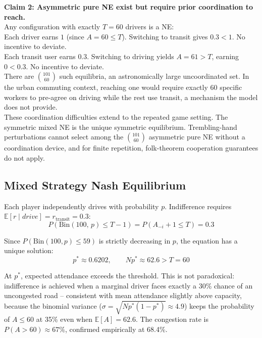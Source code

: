 \textbf{Claim 2: Asymmetric pure NE exist but require prior coordination to reach.} \\

Any configuration with exactly $T = 60$ drivers is a NE: \\

Each driver earns $1$ (since $A = 60 \leq T$). Switching to transit gives $0.3 < 1$. No incentive to deviate. \\
Each transit user earns $0.3$. Switching to driving yields $A = 61 > T$, earning $0 < 0.3$. No incentive to deviate. \\

There are $\binom{101}{60}$ such equilibria, an astronomically large uncoordinated set. In the urban commuting context, reaching one would require exactly 60 specific workers to pre-agree on driving while the rest use transit, a mechanism the model does not provide. \\

These coordination difficulties extend to the repeated game setting. The symmetric mixed NE is the unique symmetric equilibrium. Trembling-hand perturbations cannot select among the $\binom{101}{60}$ asymmetric pure NE without a coordination device, and for finite repetition, folk-theorem cooperation guarantees do not apply. \\

\subsection{Mixed Strategy Nash Equilibrium}

Each player independently drives with probability $p$. Indifference requires $\mathbb{E}[r \mid \textit{drive}] = r_{\text{transit}} = 0.3$: \\

$$
P\!\left(\text{Bin}(100,\,p) \leq T{-}1\right) = P\!\left(A_{-i} + 1 \leq T\right) = 0.3
$$

Since $P(\text{Bin}(100, p) \leq 59)$ is strictly decreasing in $p$, the equation has a unique solution: \\

$$
p^* \approx 0.6202, \qquad Np^* \approx 62.6 > T = 60
$$

At $p^*$, expected attendance exceeds the threshold. This is not paradoxical: indifference is achieved when a marginal driver faces exactly a 30\% chance of an uncongested road -- consistent with mean attendance slightly above capacity, because the binomial variance ($\sigma = \sqrt{Np^*(1-p^*)} \approx 4.9$) keeps the probability of $A \leq 60$ at 35\% even when $\mathbb{E}[A] = 62.6$. The congestion rate is $P(A > 60) \approx 67\%$, confirmed empirically at 68.4\%. \\

